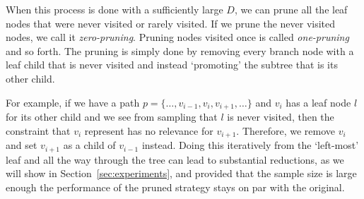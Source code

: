 When this process is done with a sufficiently large $D$, we can prune all the
leaf nodes that were never visited or rarely visited. If we prune the never
visited nodes, we call it \textit{zero-pruning}. Pruning nodes visited once is
called \textit{one-pruning} and so forth. The pruning is simply done by removing
every branch node with a leaf child that is never visited and instead
`promoting' the subtree that is its other child.

For example, if we have a path $p = \{ \ldots, v_{i-1}, v_i, v_{i+1}, \ldots \}$
and $v_i$ has a leaf node $l$ for its other child and we see from sampling that
$l$ is never visited, then the constraint that $v_i$ represent has no relevance
for $v_{i+1}$. Therefore, we remove $v_i$ and set $v_{i+1}$ as a child of
$v_{i-1}$ instead. Doing this iteratively from the `left-most' leaf and all the
way through the tree can lead to substantial reductions, as we will show in
Section~\ref{sec:experiments}, and provided that the sample size is large enough
the performance of the pruned strategy stays on par with the original.

